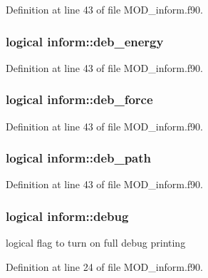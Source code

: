 Definition at line 43 of file M\-O\-D\-\_\-inform.\-f90.

\hypertarget{classinform_a77409b00f6f426775852f12fb6a2891d}{
\subsubsection[{deb\-\_\-energy}]{\setlength{\rightskip}{0pt plus 5cm}logical inform\-::deb\-\_\-energy}}\label{classinform_a77409b00f6f426775852f12fb6a2891d}


Definition at line 43 of file M\-O\-D\-\_\-inform.\-f90.

\hypertarget{classinform_a914565a9c51b80a196131eb9a7d61263}{
\subsubsection[{deb\-\_\-force}]{\setlength{\rightskip}{0pt plus 5cm}logical inform\-::deb\-\_\-force}}\label{classinform_a914565a9c51b80a196131eb9a7d61263}


Definition at line 43 of file M\-O\-D\-\_\-inform.\-f90.

\hypertarget{classinform_a371bdb361b48a1ce1cc01a8c070d2fac}{
\subsubsection[{deb\-\_\-path}]{\setlength{\rightskip}{0pt plus 5cm}logical inform\-::deb\-\_\-path}}\label{classinform_a371bdb361b48a1ce1cc01a8c070d2fac}


Definition at line 43 of file M\-O\-D\-\_\-inform.\-f90.

\hypertarget{classinform_a18f9ce5387ced589c9fd318ff053e26c}{
\subsubsection[{debug}]{\setlength{\rightskip}{0pt plus 5cm}logical inform\-::debug}}\label{classinform_a18f9ce5387ced589c9fd318ff053e26c}


logical flag to turn on full debug printing 



Definition at line 24 of file M\-O\-D\-\_\-inform.\-f90.

